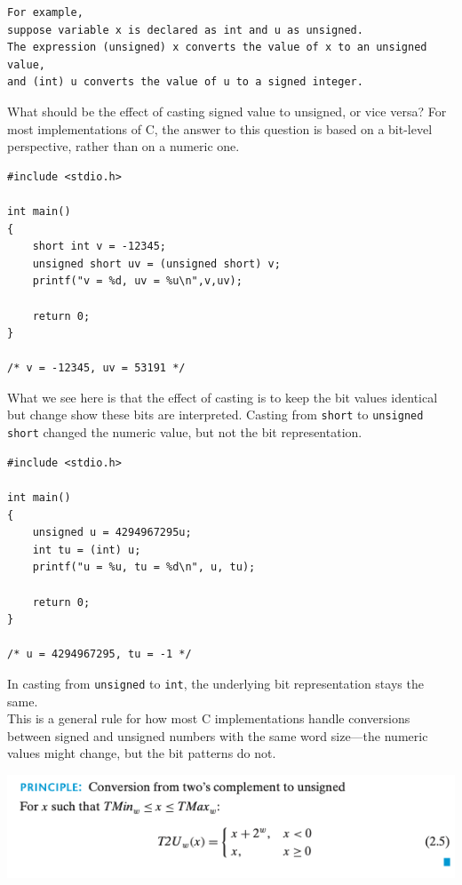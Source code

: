 \documentclass[11pt]{article}
\begin{document}
\begin{verbatim}
For example, 
suppose variable x is declared as int and u as unsigned.
The expression (unsigned) x converts the value of x to an unsigned value,
and (int) u converts the value of u to a signed integer.
\end{verbatim}

What should be the effect of casting signed value to unsigned, or vice versa? For most implementations of C, the answer to this question is based on a bit-level perspective, rather than on a numeric one.\\

\begin{verbatim}
#include <stdio.h>

int main()
{
    short int v = -12345;
    unsigned short uv = (unsigned short) v;
    printf("v = %d, uv = %u\n",v,uv);

    return 0;
}

/* v = -12345, uv = 53191 */

\end{verbatim}

What we see here is that the effect of casting is to keep the bit values identical but change show these bits are interpreted. Casting from \texttt{short} to \texttt{unsigned short} changed the numeric value, but not the bit representation.\\


\begin{verbatim}
#include <stdio.h>

int main()
{
    unsigned u = 4294967295u;
    int tu = (int) u;
    printf("u = %u, tu = %d\n", u, tu);

    return 0;
}

/* u = 4294967295, tu = -1 */

\end{verbatim}

In casting from \texttt{unsigned} to \texttt{int}, the underlying bit representation stays the same.\\


This is a general rule for how most C implementations handle conversions between signed and unsigned numbers with the same word size—the numeric values might change, but the bit patterns do not.\\


\begin{center}
\includegraphics[width=.9\linewidth]{pics/conversion-from-two's-complement-to-unsigned.png}
\end{center}
\end{document}
